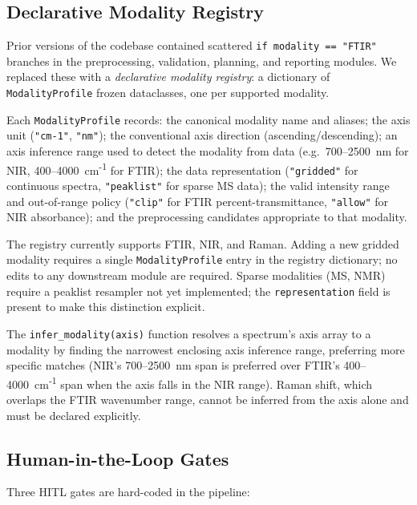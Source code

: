 \subsection{Declarative Modality Registry}
\label{sec:registry}

Prior versions of the codebase contained scattered \texttt{if modality == "FTIR"}
branches in the preprocessing, validation, planning, and reporting modules.
We replaced these with a \emph{declarative modality registry}: a dictionary of
\texttt{ModalityProfile} frozen dataclasses, one per supported modality.

Each \texttt{ModalityProfile} records:
the canonical modality name and aliases;
the axis unit (\texttt{"cm-1"}, \texttt{"nm"});
the conventional axis direction (ascending/descending);
an axis inference range used to detect the modality from data (e.g.\ 700--2500~nm
for NIR, 400--4000~cm\textsuperscript{-1} for FTIR);
the data representation (\texttt{"gridded"} for continuous spectra,
\texttt{"peaklist"} for sparse MS data);
the valid intensity range and out-of-range policy (\texttt{"clip"} for FTIR
percent-transmittance, \texttt{"allow"} for NIR absorbance);
and the preprocessing candidates appropriate to that modality.

The registry currently supports FTIR, NIR, and Raman.
Adding a new gridded modality requires a single \texttt{ModalityProfile} entry
in the registry dictionary; no edits to any downstream module are required.
Sparse modalities (MS, NMR) require a peaklist resampler not yet implemented;
the \texttt{representation} field is present to make this distinction explicit.

The \texttt{infer\_modality(axis)} function resolves a spectrum's axis array
to a modality by finding the narrowest enclosing axis inference range,
preferring more specific matches (NIR's 700--2500~nm span is preferred over
FTIR's 400--4000~cm\textsuperscript{-1} span when the axis falls in the NIR range).
Raman shift, which overlaps the FTIR wavenumber range, cannot be inferred from
the axis alone and must be declared explicitly.

\subsection{Human-in-the-Loop Gates}
\label{sec:hitl}

Three HITL gates are hard-coded in the pipeline:

